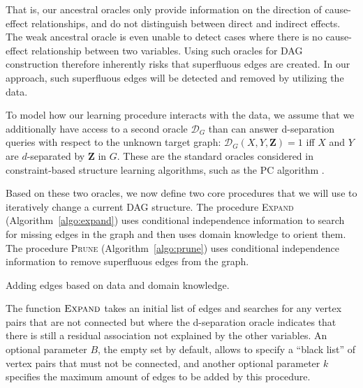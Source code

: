 \documentclass{uai2025} %
\begin{document}
That is, our ancestral oracles only provide information on the direction of cause-effect
relationships, and do not distinguish between direct and indirect effects. 
The weak ancestral oracle is even unable to detect cases where there is no cause-effect
relationship between two variables. Using such oracles for DAG construction therefore 
inherently risks that superfluous edges are created. In our approach, such superfluous edges
will be detected and removed by utilizing the data. 

To model how our learning procedure interacts with the data, we assume that we
additionally have access to a second oracle $\mathcal{D}_G$ than can answer d-separation
queries with respect to the unknown target graph:
$\mathcal{D}_G(X,Y,\mathbf{Z})=1$ iff $X$ and $Y$ are $d$-separated by $\mathbf{Z}$ in 
$G$. These are the standard oracles considered in constraint-based structure learning
algorithms, such as the PC algorithm \cite{Spirtes2001}. 

Based on these two oracles, we now define two core procedures that we will use to 
iteratively change a current DAG structure. The procedure 
\textsc{Expand} (Algorithm~\ref{algo:expand}) uses conditional independence
information to search for missing edges in the graph and then uses domain
knowledge to orient them. The procedure \textsc{Prune} (Algorithm~\ref{algo:prune}) uses
conditional independence information to remove superfluous edges from the
graph.

\begin{algorithm}[h]
\DontPrintSemicolon
\SetAlgoLined
{}
\caption{Adding edges based on data and domain knowledge.}
\label{algo:expand}
\end{algorithm}

The function $\textsc{Expand}$ takes an initial list of edges and searches for 
any vertex pairs that are not connected but where the d-separation oracle 
indicates  that there is still a residual association not explained by the other variables.
An optional parameter $B$, the empty set by default, allows to specify a ``black list''
of vertex pairs that must not be connected, and another optional parameter $k$
specifies the maximum amount of edges to be added by this procedure.
\end{document}
